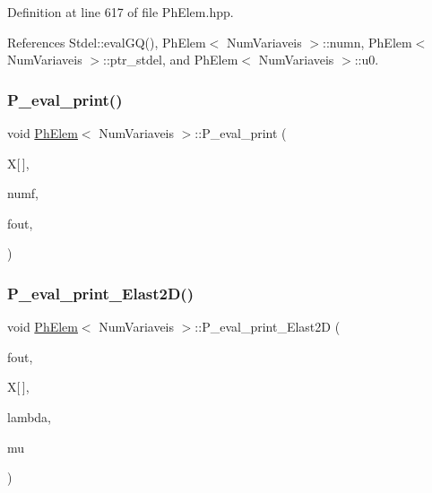 Definition at line 617 of file Ph\+Elem.\+hpp.



References Stdel\+::eval\+G\+Q(), Ph\+Elem$<$ Num\+Variaveis $>$\+::numn, Ph\+Elem$<$ Num\+Variaveis $>$\+::ptr\+\_\+stdel, and Ph\+Elem$<$ Num\+Variaveis $>$\+::u0.

\mbox{\label{classPhElem_ac5436d432516c731328134ac91b9a70b}} 
\subsubsection{\texorpdfstring{P\+\_\+eval\+\_\+print()}{P\_eval\_print()}}
{\footnotesize\ttfamily void \hyperlink{classPhElem}{Ph\+Elem}$<$ Num\+Variaveis $>$\+::P\+\_\+eval\+\_\+print (\begin{DoxyParamCaption}\item[{const double}]{X\mbox{[}$\,$\mbox{]},  }\item[{const int \&}]{numf,  }\item[{F\+I\+LE $\ast$}]{fout,  }\item[{double($\ast$)(double, double, double)}]{ }\end{DoxyParamCaption})\hspace{0.3cm}{\ttfamily [inherited]}}

\mbox{\label{classPhElem_ac3bc9b0559e940faa2404b1541d0c403}} 
\subsubsection{\texorpdfstring{P\+\_\+eval\+\_\+print\+\_\+\+Elast2\+D()}{P\_eval\_print\_Elast2D()}}
{\footnotesize\ttfamily void \hyperlink{classPhElem}{Ph\+Elem}$<$ Num\+Variaveis $>$\+::P\+\_\+eval\+\_\+print\+\_\+\+Elast2D (\begin{DoxyParamCaption}\item[{F\+I\+LE $\ast$}]{fout,  }\item[{const double}]{X\mbox{[}$\,$\mbox{]},  }\item[{double}]{lambda,  }\item[{double}]{mu }\end{DoxyParamCaption})\hspace{0.3cm}{\ttfamily [inherited]}}



